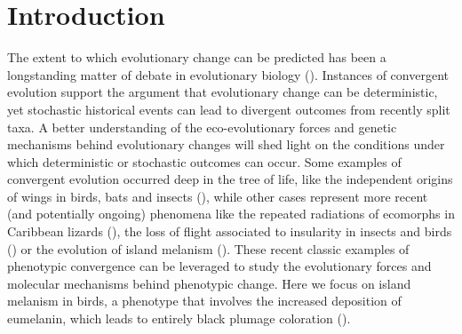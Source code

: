 \section{Introduction}
The extent to which evolutionary change can be predicted has been a longstanding matter of debate in evolutionary biology (\cite{gould1989wonderful,blount2018contingency,grant2002unpredictable}). Instances of convergent evolution support the argument that evolutionary change can be deterministic, yet stochastic historical events can lead to divergent outcomes from recently split taxa. A better understanding of the eco-evolutionary forces and genetic mechanisms behind evolutionary changes will shed light on the conditions under which deterministic or stochastic outcomes can occur. Some examples of convergent evolution occurred deep in the tree of life, like the independent origins of wings in birds, bats and insects (\cite{blount2018contingency}), while other cases represent more recent (and potentially ongoing) phenomena like the repeated radiations of ecomorphs in Caribbean lizards (\cite{mahler2013exceptional}), the loss of flight associated to insularity in insects and birds (\cite{roff1994evolution,wright2016predictable}) or the evolution of island melanism (\cite{mundy2005window}). These recent classic examples of phenotypic convergence can be leveraged to study the evolutionary forces and molecular mechanisms behind phenotypic change. Here we focus on island melanism in birds, a phenotype that involves the increased deposition of eumelanin, which leads to entirely black plumage coloration (\cite{theron2001molecular,uy2016mutations,walsh2021patterns}).


